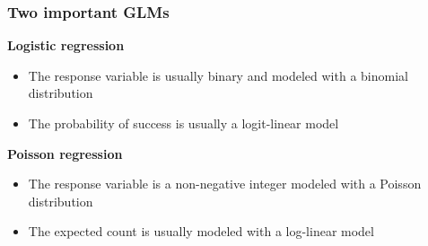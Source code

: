 \documentclass[color=usenames,dvipsnames]{beamer}\usepackage[]{graphicx}\usepackage[]{color}
\begin{document}
\begin{frame}
  \frametitle{Two important GLMs}
  {\bf Logistic regression \\}
  \begin{itemize}
    \item The response variable is usually binary and modeled with a
      binomial distribution
    \item The probability of success is usually a logit-linear
      model
  \end{itemize}
  \pause
  \vfill
  {\bf Poisson regression \\}
  \begin{itemize}
    \item The response variable is a non-negative integer modeled with
      a Poisson distribution
    \item The expected count is usually modeled with a log-linear
      model
  \end{itemize}
  \vfill
\end{frame}



\end{document}

